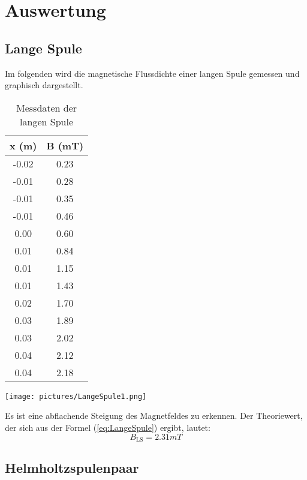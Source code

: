\section{Auswertung}
\label{sec:Auswertung}

\subsection{Lange Spule}

Im folgenden wird die magnetische Flussdichte einer langen Spule gemessen und graphisch dargestellt.
\begin{table}
\centering
\caption{Messdaten der langen Spule}
\begin{tabular}{c c}
  \toprule
  x (m) &  B (mT) \\
  \midrule
  -0.02 &         0.23 \\
  -0.01 &         0.28 \\
  -0.01 &         0.35 \\
  -0.01 &         0.46 \\
    0.00 &         0.60 \\
    0.01 &         0.84 \\
    0.01 &         1.15 \\
    0.01 &         1.43 \\
    0.02 &         1.70 \\
    0.03 &         1.89 \\
    0.03 &         2.02 \\
    0.04 &         2.12 \\
    0.04 &         2.18 \\
  \bottomrule
\end{tabular}
\end{table}

\texttt{[image: pictures/LangeSpule1.png]}    %

Es ist eine abflachende Steigung des Magnetfeldes zu erkennen. Der Theoriewert, der sich aus der Formel (\ref{eq:LangeSpule}) ergibt, lautet:
\begin{equation}
  B_{\text{LS}} = 2.31 mT
\end{equation}


\subsection{Helmholtzspulenpaar}

